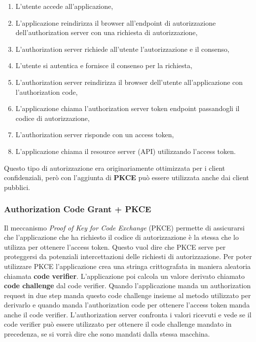 \begin{enumerate}
      \item L'utente accede all'applicazione,
      \item L'applicazione reindirizza il browser all'endpoint di autorizzazione
            dell'authorization server con una richiesta di autorizzazione,
      \item L'authorization server richiede all'utente l'autorizzazione e il consenso,
      \item L'utente si autentica e fornisce il consenso per la richiesta,
      \item L'authorization server reindirizza il browser dell'utente all'applicazione
            con l'authorization code,
      \item L'applicazione chiama l'authorization server token endpoint passandogli
            il codice di autorizzazione,
      \item L'authorization server risponde con un access token,
      \item L'applicazione chiama il resource server (API) utilizzando l'access token.
\end{enumerate}

Questo tipo di autorizzazione era originariamente ottimizzata per i
client confidenziali, però con l'aggiunta di \textbf{PKCE} può essere utilizzata anche dai
client pubblici.

\subsubsection{Authorization Code Grant + PKCE}

Il meccanismo \textit{Proof of Key for Code Exchange} (PKCE) permette di assicurarsi
che l'applicazione che ha richiesto il codice di autorizzazione è la stessa che lo
utilizza per ottenere l'access token. Questo vuol dire che PKCE serve per proteggersi
da potenziali intercettazioni delle richiesti di autorizzazione.
Per poter utilizzare PKCE l'applicazione crea una stringa crittografata in maniera
aleatoria chiamata \textbf{code verifier}. L'applicazione poi calcola un valore derivato
chiamato \textbf{code challenge} dal code verifier. Quando l'applicazione manda un
authorization request in due step manda questo code challenge insieme al metodo utilizzato
per derivarlo e quando manda l'authorization code per ottenere l'access token manda anche
il code verifier. L'authorization server confronta i valori ricevuti e vede se
il code verifier può essere utilizzato per ottenere il code challenge mandato in precedenza,
se si vorrà dire che sono mandati dalla stessa macchina.\\


